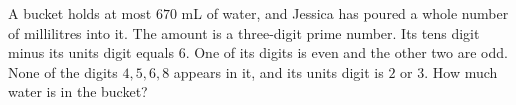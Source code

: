 A bucket holds at most $670$ mL of water, and Jessica has poured a whole number of millilitres into it. The amount is a three-digit prime number. Its tens digit minus its units digit equals $6$. One of its digits is even and the other two are odd. None of the digits $4,5,6,8$ appears in it, and its units digit is $2$ or $3$. How much water is in the bucket?
